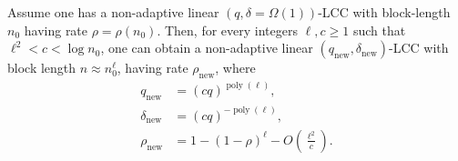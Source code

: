 \begin{nttheorem}
Assume one has a non-adaptive linear $(q,\delta=\Omega(1))$-LCC with block-length $n_0$ having rate $\rho=\rho(n_0)$. Then, for every integers $\ell,c\geq1$ such that $\ell^2<c<\log n_0$, one can obtain a non-adaptive linear $(q_{\mathrm{new}},\delta_{\mathrm{new}})$-LCC with block length $n\approx n_0^\ell$, having rate $\rho_{\mathrm{new}}$, where
\begin{align*}q_{\mathrm{new}}&=(cq)^{\operatorname{poly}(\ell)},\\\delta_{\mathrm{new}}&=(cq)^{-\operatorname{poly}(\ell)},\\\rho_{\mathrm{new}}&=1-(1-\rho)^\ell-O\left(\frac{\ell^2}c\right).\end{align*}
\end{nttheorem}
